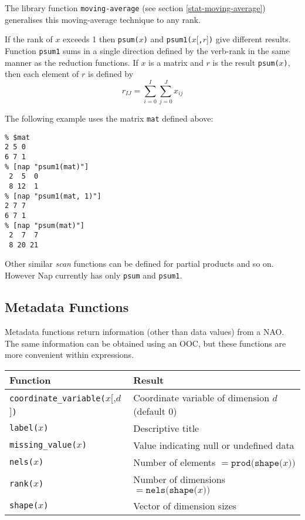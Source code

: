 The library function \texttt{moving-average}
(see section \ref{stat-moving-average})
generalises this moving-average technique to any rank.

If the rank of $x$ exceeds 1 then 
\texttt{psum(}$x$\texttt{)}
and 
\texttt{psum1(}$x$[\texttt{,}$r$]\texttt{)}
give different results.
Function \texttt{psum1} sums in a single direction defined by the
verb-rank in the same manner as the reduction functions.
If $x$ is a matrix and $r$ is the result 
\texttt{psum(}$x$\texttt{)},
then each element of $r$ is defined by
\[r_{IJ} = \sum_{i=0}^I \sum_{j=0}^J x_{ij}\]

The following example uses the matrix \texttt{mat} defined above:
  \begin{verbatim}
% $mat
2 5 0
6 7 1
% [nap "psum1(mat)"]
 2  5  0
 8 12  1
% [nap "psum1(mat, 1)"]
2 7 7
6 7 1
% [nap "psum(mat)"]
 2  7  7
 8 20 21
\end{verbatim}

  \par Other similar 
  \textit{scan} functions can be defined for partial products and so
  on. However Nap currently has only 
  \texttt{psum} and 
  \texttt{psum1}.

\subsection{Metadata Functions}
    \label{function-Metadata}

Metadata functions return information (other than data values)
  from a NAO. The same information can be obtained using an OOC, but
  these functions are more convenient within expressions.

\begin{tabular}{|l|l|}
    \hline 
      \textbf{Function} & \textbf{Result}
    \\
      \hline 
      \hline 
        \texttt{coordinate\_variable(}$x$[,$d$]\texttt{)} & Coordinate variable of dimension $d$ (default 0)
      \\
      \hline 
        \texttt{label(}$x$\texttt{)} & Descriptive title
      \\
      \hline 
        \texttt{missing\_value(}$x$\texttt{)} & Value indicating null or undefined data
      \\
      \hline 
        \texttt{nels(}$x$\texttt{)} 
	    & Number of elements $= \texttt{prod(shape(}x\texttt{))}$
      \\
      \hline 
        \texttt{rank(}$x$\texttt{)} 
	    & Number of dimensions $= \texttt{nels(shape(}x\texttt{))}$
      \\
      \hline 
        \texttt{shape(}$x$\texttt{)} & Vector of dimension sizes
      \\
  \hline
\end{tabular}

